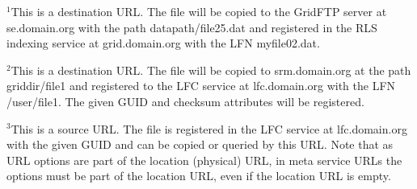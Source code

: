$^1$This is a destination URL. The file will be copied to the GridFTP
server at se.domain.org with the path datapath/file25.dat and
registered in the RLS indexing service at grid.domain.org with the LFN
myfile02.dat.

$^2$This is a destination URL. The file will be copied to
srm.domain.org at the path griddir/file1 and registered to the LFC
service at lfc.domain.org with the LFN /user/file1. The given GUID
and checksum attributes will be registered.

$^3$This is a source URL. The file is registered in the LFC service at
lfc.domain.org with the given GUID and can be copied or queried by
this URL. Note that as URL options are part of the location (physical)
URL, in meta service URLs the options must be part of the location
URL, even if the location URL is empty.
